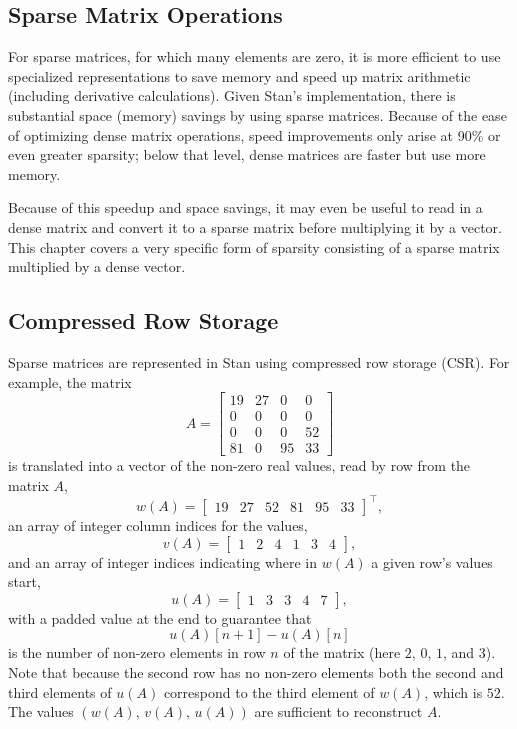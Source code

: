 \begin{description}
{\begin{description}
\chapter{Sparse Matrix Operations}\label{sparse-matrices.chapter}


For sparse matrices, for which many elements are zero, it is more efficient to use specialized representations to save memory and speed up matrix arithmetic (including derivative calculations).  Given Stan's implementation, there is substantial space (memory) savings by using sparse matrices.  Because of the ease of optimizing dense matrix operations, speed improvements only arise at 90\% or even greater sparsity; below that level, dense matrices are faster but use more memory.


Because of this speedup and space savings, it may even be useful to read in a dense matrix and convert it to a sparse matrix before multiplying it by a vector.  This chapter covers a very specific form of sparsity consisting of a sparse matrix multiplied by a dense vector.


\section{Compressed Row Storage}\label{CSR.section}


Sparse matrices are represented in Stan using compressed row storage (CSR).  For example, the matrix \[ A = \begin{bmatrix} 19 & 27 & 0 & 0 \\ 0 & 0 & 0 & 0 \\ 0 & 0 & 0 & 52 \\ 81 & 0 & 95 & 33 \end{bmatrix} \] is translated into a vector of the non-zero real values, read by row from the matrix $A$, \[ w(A) = \begin{bmatrix} 19 & 27 & 52 & 81 & 95 & 33 \end{bmatrix}^{\top} \! \! \! , \] an array of integer column indices for the values, \[ v(A) = \begin{bmatrix} 1 & 2 & 4 & 1 & 3 & 4 \end{bmatrix} \! , \] and an array of integer indices indicating where in $w(A)$ a given row's values start, \[ u(A) = \begin{bmatrix} 1 & 3 & 3 & 4 & 7 \end{bmatrix} \! , \] with a padded value at the end to guarantee that \[ u(A)[n+1] - u(A)[n] \] is the number of non-zero elements in row $n$ of the matrix (here $2$, $0$, $1$, and $3$). Note that because the second row has no non-zero elements both the second and third elements of $u(A)$ correspond to the third element of $w(A)$, which is $52$. The values $(w(A), \, v(A), \, u(A))$ are sufficient to reconstruct $A$.



\end{description}}
\end{description}
